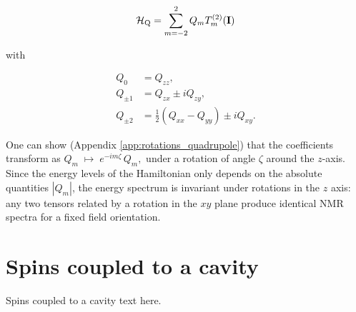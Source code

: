 \begin{equation}
    \mathcal{H}_{\text{Q}} = \sum_{m = -2}^2 Q_m T^{(2)}_m(\mathbf{I})
    \label{eq:quadrupole_spherical}
\end{equation}

\noindent with

\begin{equation}
\begin{aligned}
Q_{0} &= Q_{zz}, \\
Q_{\pm 1} &= Q_{zx} \pm i Q_{zy}, \\
Q_{\pm 2} &= \tfrac{1}{2}(Q_{xx} - Q_{yy}) \pm i Q_{xy}.
\end{aligned}
\end{equation}

One can show (Appendix \ref{app:rotations_quadrupole}) that the coefficients transform as $Q_m \;\mapsto\; e^{-im\zeta}\, Q_m,$ under a rotation of angle $\zeta$ around the $z$-axis. Since the energy levels of the Hamiltonian only depends on the absolute quantities $|Q_m|$, the energy spectrum is invariant under rotations in the $z$ axis: any two tensors related by a rotation in the $xy$ plane produce identical NMR spectra for a fixed field orientation.


\section{Spins coupled to a cavity}

Spins coupled to a cavity text here.